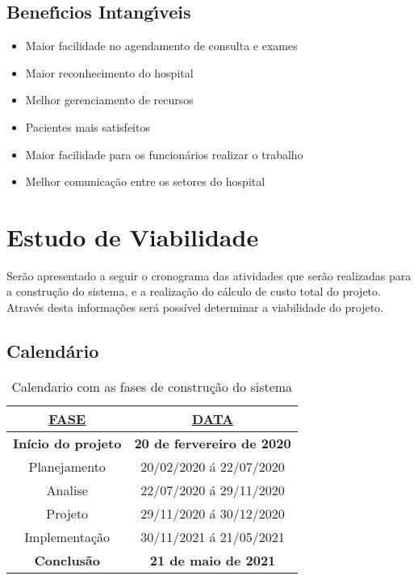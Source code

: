        \subsection{Benef\'{\i}cios Intang\'{\i}veis}
       \begin{itemize}
       \item  Maior facilidade no agendamento de consulta e exames
       \item  Maior reconhecimento do hospital
       \item  Melhor gerenciamento de recursos
       \item  Pacientes mais satisfeitos
       \item  Maior facilidade para os funcionários realizar o trabalho 
       \item  Melhor comunicação entre os setores do hospital
       
       \end{itemize}


\section{Estudo de Viabilidade}

Serão apresentado a seguir o cronograma das atividades que serão realizadas para a construção do sistema, e a realização do cálculo de custo total do projeto. Através desta informações será possível determinar a viabilidade do projeto.
       \subsection{Calend\'{a}rio }
       \begin{table}[H]
              \centering
              \caption{Calendario com as fases de construção do sistema}

              \begin{tabular}{|c|c|}

              \hline
              {\ul \textbf{FASE}}                      & {\ul \textbf{DATA}}                        \\ \hline
              \textbf{Início do projeto} & \textbf{20 de fervereiro de 2020}    \\ \hline
              Planejamento               & 20/02/2020 á 22/07/2020     \\ \hline
              Analise                    & 22/07/2020 á 29/11/2020     \\ \hline
              Projeto                    & 29/11/2020 á 30/12/2020     \\ \hline
              Implementação              & 30/11/2021 á 21/05/2021     \\ \hline
              \textbf{Conclusão}         & \textbf{21 de maio de 2021} \\ \hline
              \end{tabular}
              \end{table}
